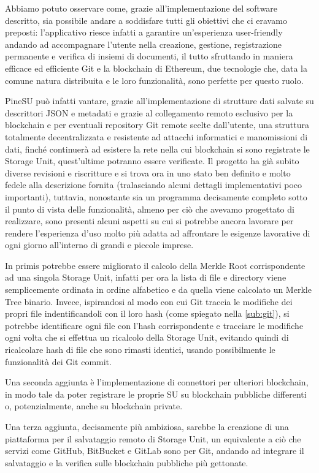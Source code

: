 \label{cap:sf}
Abbiamo potuto osservare come, grazie all'implementazione del software descritto,
sia possibile andare a soddisfare tutti gli obiettivi che ci eravamo preposti:
l'applicativo riesce infatti a garantire un'esperienza user-friendly andando ad 
accompagnare l'utente nella 
creazione, gestione, registrazione permanente e verifica di insiemi di documenti,
il tutto sfruttando in maniera efficace ed efficiente Git e la blockchain di Ethereum,
due tecnologie che, data la comune natura distribuita e le loro funzionalità,
sono perfette per questo ruolo.

PineSU può infatti vantare, grazie all'implementazione di strutture dati salvate
su descrittori JSON e metadati e grazie al collegamento remoto esclusivo per la blockchain
e per eventuali repository Git remote scelte dall'utente, una struttura totalmente
decentralizzata e resistente ad attacchi informatici e manomissioni di dati,
finché continuerà ad esistere la rete nella cui blockchain si sono registrate
le Storage Unit, quest'ultime potranno essere verificate.
Il progetto ha già subito diverse revisioni e riscritture e si trova ora in uno
stato ben definito e molto fedele alla descrizione fornita
(tralasciando alcuni dettagli implementativi poco importanti), tuttavia,
nonostante sia un programma
decisamente completo sotto il punto di vista delle funzionalità, almeno per ciò che
avevamo progettato di realizzare, sono presenti alcuni aspetti su cui si potrebbe
ancora lavorare per rendere l'esperienza d'uso molto più adatta ad affrontare le
esigenze lavorative di ogni giorno all'interno di grandi e piccole imprese.

In primis potrebbe essere migliorato il calcolo della Merkle Root corrispondente
ad una singola Storage Unit, infatti per ora la lista di file e directory viene
semplicemente ordinata in ordine alfabetico e da quella viene calcolato
un Merkle Tree binario. Invece, ispirandosi al modo con cui Git traccia le modifiche
dei propri file indentificandoli con il loro hash (come spiegato nella \autoref{sub:git}),
si potrebbe identificare ogni file con l'hash corrispondente e tracciare le modifiche ogni
volta che si effettua un ricalcolo della Storage Unit, evitando quindi di ricalcolare hash
di file che sono rimasti identici, usando possibilmente le funzionalità dei Git commit.

Una seconda aggiunta è l'implementazione di connettori per ulteriori blockchain, in modo tale
da poter registrare le proprie SU su blockchain pubbliche differenti o, potenzialmente,
anche su blockchain private.

Una terza aggiunta, decisamente più ambiziosa, sarebbe la creazione di una piattaforma
per il salvataggio remoto di Storage Unit, un equivalente a ciò che servizi come GitHub,
BitBucket e GitLab sono per Git, andando ad integrare il salvataggio e la verifica sulle
blockchain pubbliche più gettonate.